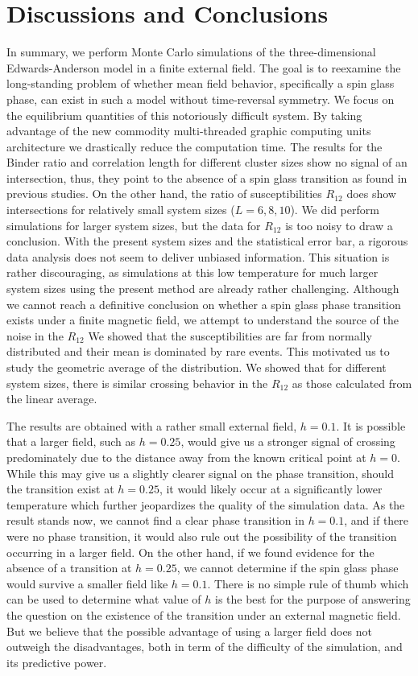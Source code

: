 \documentclass[aps,prb,twocolumn,showpacs,superscriptaddress]{revtex4}
\begin{document}
\section{Discussions and Conclusions}
In summary, we perform Monte Carlo simulations of the three-dimensional
Edwards-Anderson model in a finite external field. The goal is to reexamine the 
long-standing problem of whether mean field behavior, specifically a spin glass phase, can
exist in such a model without time-reversal symmetry. We focus on the equilibrium quantities
of this notoriously difficult system. By taking advantage of the new commodity multi-threaded 
graphic computing units architecture we drastically reduce the computation time. The results 
for the Binder ratio and correlation length for different cluster sizes show no signal of an 
intersection, thus, they point to the absence of a spin glass transition
as found in previous studies. On the other hand, the ratio of susceptibilities 
$R_{12}$ does show intersections for relatively small system sizes ($L=6,8,10$). 
We did perform simulations for larger system sizes, but the data for $R_{12}$ 
is too noisy to draw a conclusion.
With the present system sizes and the statistical error bar, a rigorous data 
analysis does not seem to deliver unbiased information. 
This situation is rather discouraging, as simulations at this low temperature 
for much larger system sizes using the present method are already rather challenging.
Although we cannot reach a definitive conclusion on whether a spin glass phase 
transition exists under a finite magnetic field, we attempt to understand the 
source of the noise in the $R_{12}$ We showed that the susceptibilities 
are far from normally distributed and their mean is dominated by rare events.
This motivated us to study the geometric average of the distribution. 
We showed that for different system sizes, there is similar crossing behavior 
in the $R_{12}$ as those calculated from the linear average. 


The results are obtained with a rather small external field, $h=0.1$. It is possible
that a larger field, such as $h=0.25$, would give us a stronger signal of crossing 
predominately due to the distance away from the known critical point at $h=0$. 
While this may give us a slightly clearer signal on the phase transition, should 
the transition exist at $h=0.25$, it would likely occur at a significantly lower temperature
which further jeopardizes the quality of the simulation data. As the result stands now, 
we cannot find a clear phase transition in $h=0.1$, and if there were no phase transition, 
it would also rule out the possibility of the transition occurring in a larger field. 
On the other hand, if we found evidence for the absence of a transition at $h=0.25$, we 
cannot determine if the spin glass phase would survive a smaller field like $h=0.1$. 
There is no simple rule of thumb which can be used to determine what value of $h$ is 
the best for the purpose of answering the question on the existence of the transition 
under an external magnetic field. But we believe that the possible advantage of using  
a larger field does not outweigh the disadvantages, both in term of the difficulty
of the simulation, and its predictive power. 
\end{document}
